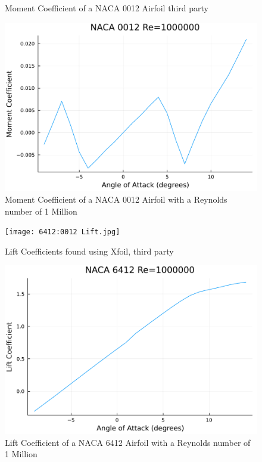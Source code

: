 \documentclass{article}
\begin{document}
\begin{figure}[h]
\begin{minipage}[b]{0.32\textwidth}
\caption{\label{fig:Xfoil 0012 Moment}Moment Coefficient of a NACA 0012 Airfoil third party}
\end{minipage}
\begin{minipage}[b]{0.32\textwidth}
\centering
\includegraphics[width=\textwidth]{NACA 0012 Re=1000000_Moment_Coefficent_Plot.pdf}
\caption{\label{fig:NACA 0012 Moment}Moment Coefficient of a NACA 0012 Airfoil with a Reynolds number of 1 Million}
\end{minipage}
\end{figure}

\begin{figure}[h]
    \centering
\begin{minipage}[b]{0.66\textwidth}
\centering
\texttt{[image: 6412:0012 Lift.jpg]}
\caption{\label{fig:Xfoil Lift}Lift Coefficients found using Xfoil, third party}
\end{minipage}
\begin{minipage}[b]{0.32\textwidth}
\centering
\includegraphics[width=\textwidth]{NACA 6412 Re=1000000_Lift_Coefficent_Plot.pdf}
\caption{\label{fig:NACA 6412 Lift}Lift Coefficient of a NACA 6412 Airfoil with a Reynolds number of 1 Million}
\end{minipage}
\end{figure}
\end{document}
